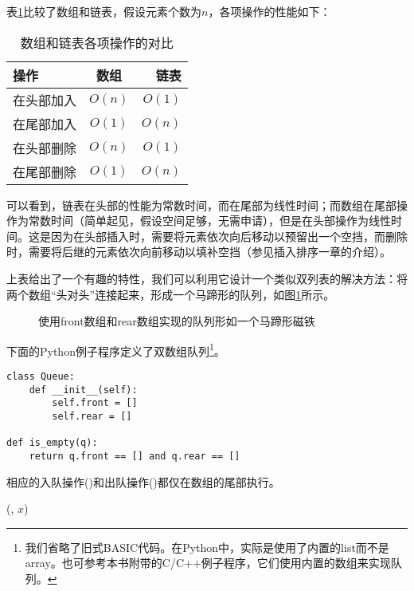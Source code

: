 \documentclass[UTF8]{article}
\begin{document}
表\ref{tab:array-list-comp}比较了数组和链表，假设元素个数为$n$，各项操作的性能如下：

\begin{table}[htbp]
\centering
\begin{tabular}{l | c | r}
  \hline
  操作 & 数组 & 链表 \\
  \hline
  在头部加入 & $O(n)$ & $O(1)$ \\
  在尾部加入 & $O(1)$ & $O(n)$ \\
  在头部删除 & $O(n)$ & $O(1)$ \\
  在尾部删除 & $O(1)$ & $O(n)$ \\
  \hline
\end{tabular}
\caption{数组和链表各项操作的对比} \label{tab:array-list-comp}
\end{table}

可以看到，链表在头部的性能为常数时间，而在尾部为线性时间；而数组在尾部操作为常数时间（简单起见，假设空间足够，无需申请），但是在头部操作为线性时间。这是因为在头部插入时，需要将元素依次向后移动以预留出一个空挡，而删除时，需要将后继的元素依次向前移动以填补空挡（参见插入排序一章的介绍）。

上表给出了一个有趣的特性，我们可以利用它设计一个类似双列表的解决方法：将两个数组“头对头”连接起来，形成一个马蹄形的队列，如图\ref{fig:horseshoe-array}所示。

\begin{figure}[htbp]
  \centering
  \caption{使用front数组和rear数组实现的队列形如一个马蹄形磁铁} \label{fig:horseshoe-array}
\end{figure}

下面的Python例子程序定义了双数组队列\footnote{我们省略了旧式BASIC代码。在Python中，实际是使用了内置的list而不是array。也可参考本书附带的C/C++例子程序，它们使用内置的数组来实现队列。}。

\lstset{language=Python}
\begin{lstlisting}
class Queue:
    def __init__(self):
        self.front = []
        self.rear = []

def is_empty(q):
    return q.front == [] and q.rear == []
\end{lstlisting}

相应的入队操作()和出队操作()都仅在数组的尾部执行。

\begin{algorithmic}
  \State {}(, $x$)
\EndFunction
\end{algorithmic}
\end{document}

